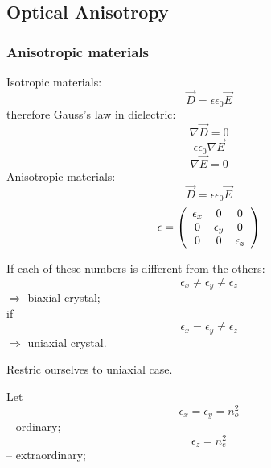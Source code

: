 \documentclass[10pt]{article}
\begin{document}
\subsection{Optical Anisotropy}
\subsubsection{Anisotropic materials}
Isotropic materials:
\begin{equation*}
\vec{D} = \epsilon \epsilon_0 \vec{E}
\end{equation*}
therefore Gauss's law in dielectric:
\begin{equation*}
\nabla \vec{D} = 0
\end{equation*}
\begin{equation*}
\epsilon \epsilon_0 \nabla \vec{E}
\end{equation*}
\begin{equation*}
\nabla \vec{E} = 0
\end{equation*}
Anisotropic materials:
\begin{equation*}
\vec{D} = \epsilon \epsilon_0 \vec{E}
\end{equation*}
\begin{equation*}
\bar{\epsilon} = \left(
\begin{array}{c c c}
\epsilon_x & 0 & 0 \\
0 & \epsilon_y & 0 \\
0 & 0 & \epsilon_z \\
\end{array}
\right)
\end{equation*}

If each of these numbers is different from the others:
\begin{equation*}
\epsilon_x \neq \epsilon_y \neq \epsilon_z
\end{equation*}
$\Rightarrow$ biaxial crystal; \\
if
\begin{equation*}
\epsilon_x = \epsilon_y \neq \epsilon_z
\end{equation*}
$\Rightarrow$ uniaxial crystal.

Restric ourselves to uniaxial case.

Let
\begin{equation*}
\epsilon_x = \epsilon_y  = n_o ^2
\end{equation*}
-- ordinary;
\begin{equation*}
\epsilon_z  = n_e ^2
\end{equation*}
-- extraordinary;
\end{document}
